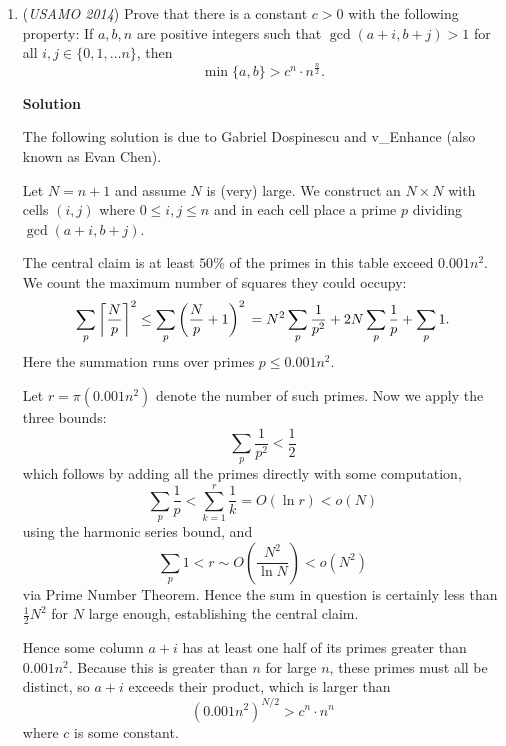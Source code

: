 \begin{enumerate}
 (Lokman GÖKÇE)

 


	\item (\textit{USAMO 2014}) Prove that there is a constant $c>0$ with the following property: If $a, b, n$ are positive integers such that $\gcd(a+i, b+j)>1$ for all $i, j\in\{0, 1, \ldots n\}$, then
 \[\min\{a, b\}>c^n\cdot n^{\frac{n}{2}}.\]




\textbf{Solution}

The following solution is due to Gabriel Dospinescu and v\_Enhance (also known as Evan Chen).

 Let $N = n+1$ and assume $N$ is (very) large. We construct an $N \times N$ with cells $(i,j)$ where $0 \le i, j \le n$ and in each cell place a prime $p$ dividing $\gcd (a+i, b+j)$.

 The central claim is at least $50\%$ of the primes in this table exceed $0.001n^2$. We count the maximum number of squares they could occupy:
 \[\sum_p \left\lceil \frac{N}{p} \right\rceil^2  		\le \sum_p \left( \frac Np + 1 \right)^2 \\ 		= N^2 \sum_p \frac{1}{p^2} + 2N \sum_p \frac1p + \sum_p 1.\] Here the summation runs over primes $p \le 0.001n^2$.

 Let $r = \pi(0.001n^2)$ denote the number of such primes. Now we apply the three bounds: 
 \[\sum_p \frac{1}{p^2} < \frac 12\] which follows by adding all the primes directly with some computation, 
 \[\sum_p \frac 1p < \sum_{k=1}^r \frac 1k = O(\ln r) < o(N)\] using the harmonic series bound, and 
 \[\sum_p 1 < r \sim O \left( \frac{N^2}{\ln N} \right) < o(N^2)\] via Prime Number Theorem.  Hence the sum in question is certainly less than $\frac 12 N^2$ for $N$ large enough, establishing the central claim.

 Hence some column $a+i$ has at least one half of its primes greater than $0.001n^2$. Because this is greater than $n$ for large $n$, these primes must all be distinct, so $a+i$ exceeds their product, which is larger than 
 \[\left( 0.001n^2 \right)^{N/2} > c^n \cdot n^n\] where $c$ is some constant.

 


\end{enumerate}